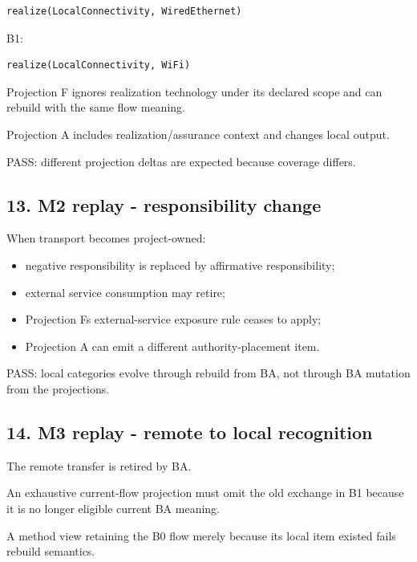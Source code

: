 \documentclass[11pt,a4paper]{article}
\providecommand{\tightlist}{\setlength{\itemsep}{0pt}\setlength{\parskip}{0pt}}
\begin{document}
\begin{verbatim}
realize(LocalConnectivity, WiredEthernet)
\end{verbatim}

B1:

\begin{verbatim}
realize(LocalConnectivity, WiFi)
\end{verbatim}

Projection F ignores realization technology under its declared scope and
can rebuild with the same flow meaning.

Projection A includes realization/assurance context and changes local
output.

PASS: different projection deltas are expected because coverage differs.

\subsection{13. M2 replay - responsibility
change}\label{13-m2-replay---responsibility-change}

When transport becomes project-owned:

\begin{itemize}
\tightlist
\item
  negative responsibility is replaced by affirmative responsibility;
\item
  external service consumption may retire;
\item
  Projection F\textquotesingle s external-service exposure rule ceases
  to apply;
\item
  Projection A can emit a different authority-placement item.
\end{itemize}

PASS: local categories evolve through rebuild from BA, not through BA
mutation from the projections.

\subsection{14. M3 replay - remote to local
recognition}\label{14-m3-replay---remote-to-local-recognition}

The remote transfer is retired by BA.

An exhaustive current-flow projection must omit the old exchange in B1
because it is no longer eligible current BA meaning.

A method view retaining the B0 flow merely because its local item
existed fails rebuild semantics.
\end{document}
